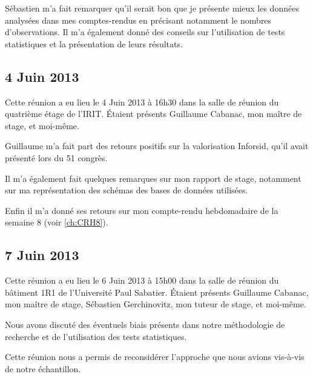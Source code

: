 	Sébastien m'a fait remarquer qu'il serait bon que je présente mieux les données analysées dans mes comptes-rendus en précisant notamment le nombres d'observations. Il m'a également donné des conseils sur l'utilisation de tests statistiques et la présentation de leurs résultats.
	
	
	\subsection{4 Juin 2013}
		Cette réunion a eu lieu le 4 Juin 2013 à 16h30 dans la salle de réunion du quatrième étage de l'IRIT. Étaient présents Guillaume Cabanac, mon maître de stage, et moi-même.
		
		Guillaume m'a fait part des retours positifs sur la valorisation Inforsid, qu'il avait présenté lors du 51 congrès.
		
		Il m'a également fait quelques remarques sur mon rapport de stage, notamment sur ma représentation des schémas des bases de données utilisées.
		
		Enfin il m'a donné ses retours sur mon compte-rendu hebdomadaire de la semaine 8 (voir \ref{ch:CRH8}).
	
	
	\subsection{7 Juin 2013}
		Cette réunion a eu lieu le 6 Juin 2013 à 15h00 dans la salle de réunion du bâtiment 1R1 de l'Université Paul Sabatier. Étaient présents Guillaume Cabanac, mon maître de stage, Sébastien Gerchinovitz, mon tuteur de stage, et moi-même.
		
		Nous avons discuté des éventuels biais présents dans notre méthodologie de recherche et de l'utilisation des tests statistiques.
		
		Cette réunion nous a permis de reconsidérer l'approche que nous avions vis-à-vis de notre échantillon.
	
	
	